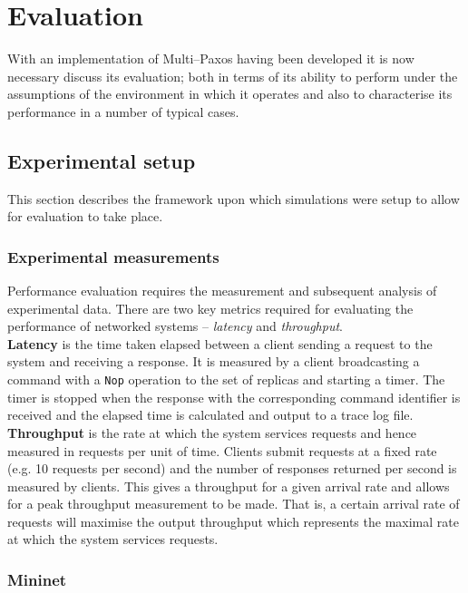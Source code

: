 \chapter{Evaluation}

With an implementation of Multi--Paxos having been developed it is now necessary discuss its evaluation; both in terms of its ability to perform under the assumptions of the environment in which it operates and also to characterise its performance in a number of typical cases.

\section{Experimental setup}

This section describes the framework upon which simulations were setup to allow for evaluation to take place.

\subsection{Experimental measurements}

Performance evaluation requires the measurement and subsequent analysis of experimental data. There are two key metrics required for evaluating the performance of networked systems -- \emph{latency} and \emph{throughput}. \\

\textbf{Latency} is the time taken elapsed  between a client sending a request to the system and receiving a response. It is measured by a client broadcasting a command with a \texttt{Nop} operation to the set of replicas and starting a timer. The timer is stopped when the response with the corresponding command identifier is received and the elapsed time is calculated and output to a trace log file. \\

\textbf{Throughput} is the rate at which the system services requests and hence measured in requests per unit of time. Clients submit requests at a fixed rate (e.g. 10 requests per second) and the number of responses returned per second is measured by clients. This gives a throughput for a given arrival rate and allows for a peak throughput measurement to be made. That is, a certain arrival rate of requests will maximise the output throughput which represents the maximal rate at which the system services requests. \\

\subsection{Mininet}

